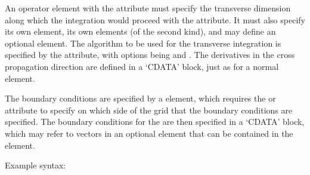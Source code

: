 \documentclass[letterpaper,10pt,english]{sphinxmanual}
\begin{document}
\ignorespaces 
\sphinxAtStartPar
An operator element with the  attribute must specify the transverse dimension along which the integration would proceed with the  attribute.  It must also specify its own {\hyperref[\detokenize{reference_elements:integrationvectorselement}]{}} element, its own  elements (of the second kind), and may define an optional {\hyperref[\detokenize{reference_elements:dependencies}]{}} element.  The algorithm to be used for the transverse integration is specified by the  attribute, with options being  and .  The derivatives in the cross propagation direction are defined in a ‘CDATA’ block, just as for a normal  element.

\ignorespaces 
{}\ignorespaces {}\label{\detokenize{reference_elements:boundaryconditionelement}}
\sphinxAtStartPar
The boundary conditions are specified by a  element, which requires the  or  attribute to specify on which side of the grid that the boundary conditions are specified.  The boundary conditions for the  are then specified in a ‘CDATA’ block, which may refer to vectors in an optional {\hyperref[\detokenize{reference_elements:dependencies}]{}} element that can be contained in the  element.

\sphinxAtStartPar
Example syntax:
\end{document}

